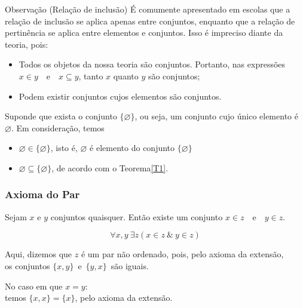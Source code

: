          \begin{mymdframed}{Observação (Relação de inclusão)}
            É comumente apresentado em escolas que a relação de inclusão se aplica apenas entre conjuntos, enquanto que a relação de pertinência se aplica entre elementos e conjuntos. Isso é impreciso diante da teoria, pois:
            \begin{itemize}
               \item Todos os objetos da nossa teoria são conjuntos. Portanto, nas expressões $x \in y$\ \ e\ \ $x \subseteq y$, tanto $x$ quanto $y$ são conjuntos;
               \item Podem existir conjuntos cujos elementos são conjuntos.
            \end{itemize}
            Suponde que exista o conjunto $\{\varnothing\}$, ou seja, um conjunto cujo único elemento é $\varnothing$. Em consideração, temos
            \begin{itemize}
                  \item $\varnothing \in \{\varnothing\}$, isto é, $\varnothing$ é elemento do conjunto $\{\varnothing\}$
                  \item $\varnothing \subseteq \{\varnothing\}$, de acordo com o Teorema\ref{T1}.
            \end{itemize}
         \end{mymdframed}
      
      \subsubsection{Axioma do Par}
         \begin{stat}
            Sejam $x$ e $y$ conjuntos quaisquer. Então existe um conjunto $x \in z$\ \ e\ \ $y \in z$.
         \end{stat}
            $$\forall x, y\ \exists z (x \in z\ \&\ y \in z)$$
         \begin{center}
            Aqui, dizemos que $z$ é um par não ordenado, pois, pelo axioma da extensão, \\
            os conjuntos $\{x, y\}$\ e\ $\{y, x\}$\ são iguais.
         \end{center}
         \begin{exmp}
            No caso em que $x=y$: \\
            temos $\{x, x\} = \{x\}$, pelo axioma da extensão.
         \end{exmp}


